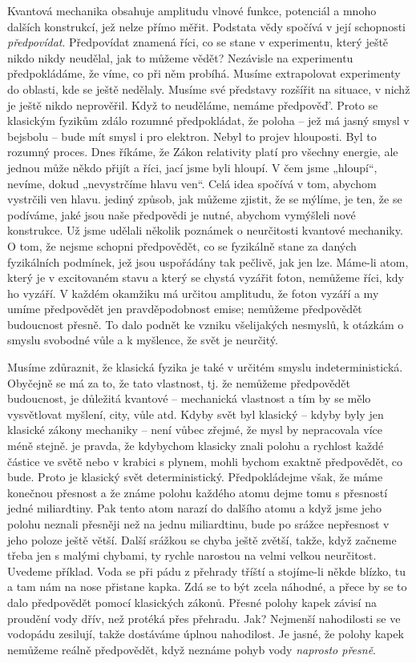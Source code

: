     Kvantová mechanika obsahuje amplitudu vlnové funkce, potenciál a mnoho dalších konstrukcí, jež
    nelze přímo měřit. Podstata vědy spočívá v její schopnosti \emph{předpovídat}. Předpovídat
    znamená říci, co se stane v experimentu, který ještě nikdo nikdy neudělal, jak to můžeme vědět?
    Nezávisle na experimentu předpokládáme, že víme, co při něm probíhá. Musíme extrapolovat
    experimenty do oblasti, kde se ještě nedělaly. Musíme své představy rozšířit na situace, v nichž
    je ještě nikdo neprověřil. Když to neuděláme, nemáme předpověď'. Proto se klasickým fyzikům
    zdálo rozumné předpokládat, že poloha – jež má jasný smysl v bejsbolu – bude mít smysl i pro
    elektron. Nebyl to projev hlouposti. Byl to rozumný proces. Dnes říkáme, že Zákon relativity
    platí pro všechny energie, ale jednou může někdo přijít a říci, jací jsme byli hloupí. V čem
    jsme „hloupí“, nevíme, dokud „nevystrčíme hlavu ven“. Celá idea spočívá v tom, abychom vystrčili
    ven hlavu. jediný způsob, jak můžeme zjistit, že se mýlíme, je ten, že se podíváme, jaké jsou
    naše předpovědi je nutné, abychom vymýšleli nové konstrukce. Už jsme udělali několik poznámek o
    neurčitosti kvantové mechaniky. O tom, že nejsme schopni předpovědět, co se fyzikálně stane za
    daných fyzikálních podmínek, jež jsou uspořádány tak pečlivě, jak jen lze. Máme-li atom, který
    je v excitovaném stavu a který se chystá vyzářit foton, nemůžeme říci, kdy ho vyzáří. V každém
    okamžiku má určitou amplitudu, že foton vyzáří a my umíme předpovědět jen pravděpodobnost emise;
    nemůžeme předpovědět budoucnost přesně. To dalo podnět ke vzniku všelijakých nesmyslů, k otázkám
    o smyslu svobodné vůle a k myšlence, že svět je neurčitý. 
    
    Musíme zdůraznit, že klasická fyzika je také v určitém smyslu indeterministická. Obyčejně se má
    za to, že tato vlastnost, tj. že nemůžeme předpovědět budoucnost, je důležitá kvantové –
    mechanická vlastnost a tím by se mělo vysvětlovat myšlení, city, vůle atd. Kdyby svět byl
    klasický – kdyby byly jen klasické zákony mechaniky – není vůbec zřejmé, že mysl by nepracovala
    více méně stejně. je pravda, že kdybychom klasicky znali polohu a rychlost každé částice ve
    světě nebo v krabici s plynem, mohli bychom exaktně předpovědět, co bude. Proto je klasický svět
    deterministický. Předpokládejme však, že máme konečnou přesnost a že známe polohu každého atomu
    dejme tomu s přesností jedné miliardtiny. Pak tento atom narazí do dalšího atomu a když jsme
    jeho polohu neznali přesněji než na jednu miliardtinu, bude po srážce nepřesnost v jeho poloze
    ještě větší. Další srážkou se chyba ještě zvětší, takže, když začneme třeba jen s malými
    chybami, ty rychle narostou na velmi velkou neurčitost. Uvedeme příklad. Voda se při pádu z
    přehrady tříští a stojíme-li někde blízko, tu a tam nám na nose přistane kapka. Zdá se to být
    zcela náhodné, a přece by se to dalo předpovědět pomocí klasických zákonů. Přesné polohy kapek
    závisí na proudění vody dřív, než protéká přes přehradu. Jak? Nejmenší nahodilosti se ve
    vodopádu zesilují, takže dostáváme úplnou nahodilost. Je jasné, že polohy kapek nemůžeme reálně
    předpovědět, když neznáme pohyb vody \emph{naprosto přesně}. 
    
